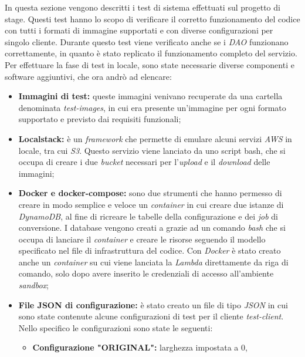 In questa sezione vengono descritti i test di sistema effettuati sul progetto di
stage. Questi test hanno lo scopo di verificare il corretto funzionamento del
codice con tutti i formati di immagine supportati e con diverse configurazioni
per singolo cliente. Durante questo test viene verificato anche se i \emph{DAO}
funzionano correttamente, in quanto è stato replicato il funzionamento completo
del servizio. \\
Per effettuare la fase di test in locale, sono state necessarie diverse
componenti e software aggiuntivi, che ora andrò ad elencare:
\begin{itemize}
    \item \textbf{Immagini di test:} queste immagini venivano recuperate da una
          cartella denominata \emph{test-images}, in cui era presente un'immagine per
          ogni formato supportato e previsto dai requisiti funzionali;
    \item \textbf{Localstack:} è un \emph{framework} che permette di emulare
          alcuni servizi \emph{AWS} in locale, tra cui \emph{S3}. Questo servizio viene lanciato da uno script
          \glsfirstoccur\gls{bash}, che si occupa di creare i due \emph{bucket}
          necessari per l'\emph{upload} e il \emph{download} delle immagini; \cite{localstack}
    \item \textbf{Docker e docker-compose:} sono due strumenti che hanno
          permesso di creare in modo semplice e veloce un \emph{container} in cui
          creare due istanze di \emph{DynamoDB}, al fine di ricreare le tabelle della
          configurazione e dei \emph{job} di conversione. I database vengono creati a
          grazie ad un comando \emph{bash} che si occupa di lanciare il
          \emph{container} e creare le risorse seguendo il modello specificato nel
          file di infrastruttura del codice. Con \emph{Docker} è stato creato
          anche un \emph{container} su cui viene lanciata la \emph{Lambda}
          direttamente da riga di comando, solo dopo avere inserito le
          credenziali di accesso all'ambiente \emph{sandbox};
    \item \textbf{File JSON di configurazione:} è stato creato un file di tipo
          \emph{JSON} in cui sono state contenute alcune configurazioni di test per il
          cliente \emph{test-client}. Nello specifico le configurazioni sono state le
          seguenti:
          \begin{itemize}
              \item \textbf{Configurazione "ORIGINAL":} larghezza impostata a 0,

\end{itemize}
\end{itemize}
